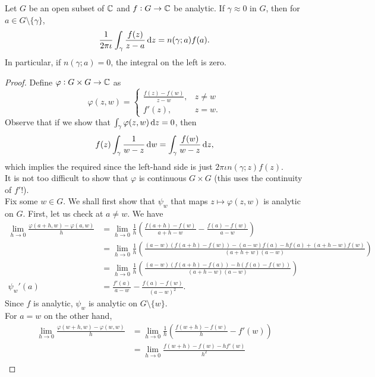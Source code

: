 		\begin{ftheo}
			\label{cauchy integral formula v1}
			Let $G$ be an open subset of $\mathbb{C}$ and $f : G \to \mathbb{C}$ be analytic. If $\gamma \approx 0$ in $G$, then for $a \in G\setminus\{\gamma\}$,
			\[ \frac{1}{2\pi\iota} \int_\gamma \frac{f(z)}{z-a} \dif z = n(\gamma;a) f(a). \]
			In particular, if $n(\gamma;a) = 0$, the integral on the left is zero.
		\end{ftheo}
		\begin{proof}
			Define $\varphi : G \times G \to \mathbb{C}$ as
			\[ \varphi(z,w) =
				\begin{cases}
					\frac{f(z) - f(w)}{z-w}, & z\ne w \\
					f'(z), & z=w.
				\end{cases}
			\]
			Observe that if we show that $\int_\gamma \varphi(z,w) \dif z = 0$, then
			\[ f(z) \int_\gamma \frac{1}{w-z} \dif w = \int_\gamma \frac{f(w)}{w-z} \dif z, \]
			which implies the required since the left-hand side is just $2\pi\iota n(\gamma;z) f(z)$.\\
			It is not too difficult to show that $\varphi$ is continuous $G\times G$ (this uses the continuity of $f'$!).\\
			Fix some $w \in G$. We shall first show that $\psi_w$ that maps $z \mapsto \varphi(z,w)$ is analytic on $G$. First, let us check at $a \ne w$. We have
			\begin{align*}
			 	\lim_{h\to 0} \frac{\varphi(a+h,w) - \varphi(a,w)}{h} &= \lim_{h\to 0} \frac{1}{h} \left( \frac{f(a+h) - f(w)}{a+h-w} - \frac{f(a) - f(w)}{a-w} \right) \\
			 		&= \lim_{h \to 0} \frac{1}{h} \left( \frac{(a-w) (f(a+h) - f(w)) - (a-w) f(a) - hf(a) + (a+h-w)f(w)}{(a+h+w)(a-w)} \right) \\
			 		&= \lim_{h \to 0} \frac{1}{h} \left( \frac{(a-w)(f(a+h)-f(a)) - h(f(a)-f(w))}{(a+h-w)(a-w)} \right) \\
			 	\psi_w'(a) &= \frac{f'(a)}{a-w} - \frac{f(a)-f(w)}{(a-w)^2}.
			\end{align*} 
			Since $f$ is analytic, $\psi_w$ is analytic on $G \setminus \{w\}$.\\
			For $a=w$ on the other hand,
			\begin{align}
				\lim_{h\to 0} \frac{\varphi(w+h,w) - \varphi(w,w)}{h} &= \lim_{h\to 0} \frac{1}{h} \left( \frac{f(w+h) - f(w)}{h} - f'(w) \right) \nonumber \\
					&= \lim_{h\to 0} \frac{f(w+h) - f(w) - hf'(w)}{h^2} \label{eqn: 2.8} \\

\end{align}
\end{proof}

